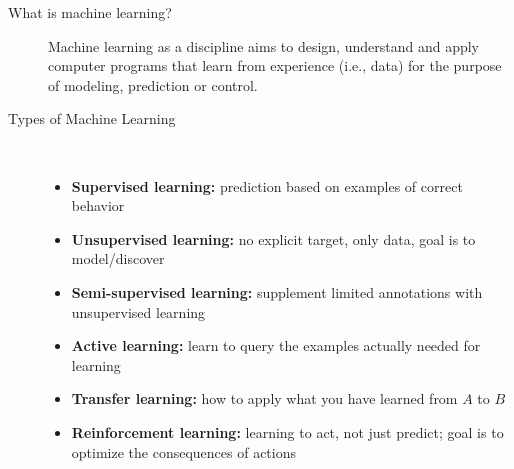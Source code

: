 \documentclass[10pt,landscape,a4paper]{article}
\begin{document}
\begin{multicols*}{3}
\begin{description}
	\item[What is machine learning?] Machine learning as a discipline aims to design, understand and apply computer programs that learn from experience (i.e., data) for the purpose of modeling, prediction or control.
	\item[Types of Machine Learning] ~
	\begin{itemize}
		\item {\bf Supervised learning:} prediction based on examples of correct behavior
		\item {\bf Unsupervised learning:} no explicit target, only data, goal is to model/discover
		\item {\bf Semi-supervised learning:} supplement limited annotations with unsupervised learning
		\item {\bf Active learning:} learn to query the examples actually needed for learning
		\item {\bf Transfer learning:} how to apply what you have learned from $A$ to $B$
		\item {\bf Reinforcement learning:} learning to act, not just predict; goal is to optimize the consequences of actions
	\end{itemize}
\end{description}


\end{multicols*}
\end{document}
